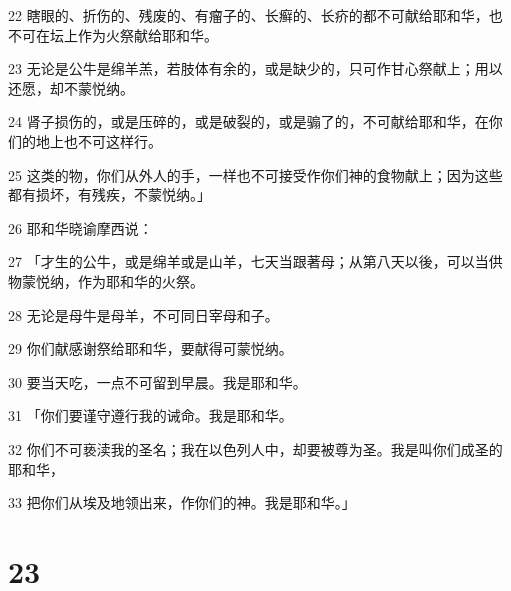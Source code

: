\par 22 瞎眼的、折伤的、残废的、有瘤子的、长癣的、长疥的都不可献给耶和华，也不可在坛上作为火祭献给耶和华。
\par 23 无论是公牛是绵羊羔，若肢体有余的，或是缺少的，只可作甘心祭献上；用以还愿，却不蒙悦纳。
\par 24 肾子损伤的，或是压碎的，或是破裂的，或是骟了的，不可献给耶和华，在你们的地上也不可这样行。
\par 25 这类的物，你们从外人的手，一样也不可接受作你们神的食物献上；因为这些都有损坏，有残疾，不蒙悦纳。」
\par 26 耶和华晓谕摩西说：
\par 27 「才生的公牛，或是绵羊或是山羊，七天当跟著母；从第八天以後，可以当供物蒙悦纳，作为耶和华的火祭。
\par 28 无论是母牛是母羊，不可同日宰母和子。
\par 29 你们献感谢祭给耶和华，要献得可蒙悦纳。
\par 30 要当天吃，一点不可留到早晨。我是耶和华。
\par 31 「你们要谨守遵行我的诫命。我是耶和华。
\par 32 你们不可亵渎我的圣名；我在以色列人中，却要被尊为圣。我是叫你们成圣的耶和华，
\par 33 把你们从埃及地领出来，作你们的神。我是耶和华。」

\chapter{23}

